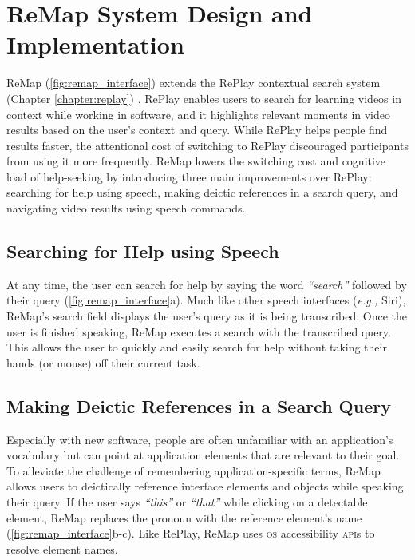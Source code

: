 \section{ReMap System Design and Implementation}
ReMap (\autoref{fig:remap_interface}) extends the RePlay contextual search system (Chapter \ref{chapter:replay}) . RePlay enables users to search for learning videos in context while working in software, and it highlights relevant moments in video results based on the user's context and query. While RePlay helps people find results faster, the attentional cost of switching to RePlay discouraged participants from using it more frequently. ReMap lowers the switching cost and cognitive load of help-seeking by introducing three main improvements over RePlay: searching for help using speech, making deictic references in a search query, and navigating video results using speech commands.

\subsection{Searching for Help using Speech}
At any time, the user can search for help by saying the word \textit{``search''} followed by their query (\autoref{fig:remap_interface}a). Much like other speech interfaces (\textit{e.g.,} Siri), ReMap's search field displays the user's query as it is being transcribed. Once the user is finished speaking, ReMap executes a search with the transcribed query. This allows the user to quickly and easily search for help without taking their hands (or mouse) off their current task.

\subsection{Making Deictic References in a Search Query}
Especially with new software, people are often unfamiliar with an application's vocabulary but can point at application elements that are relevant to their goal. 
To alleviate the challenge of remembering application-specific terms, ReMap allows users to deictically reference interface elements and objects while speaking their query. If the user says \textit{``this''} or \textit{``that''} while clicking on a detectable element, ReMap replaces the pronoun with the reference element's name (\autoref{fig:remap_interface}b-c). Like RePlay, ReMap uses \textsc{os} accessibility \textsc{api}s to resolve element names. 

